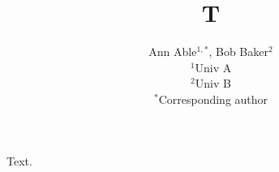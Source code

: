 \documentclass{article}
\begin{document}
\title{T}\author{Ann Able$^{1,*}$, Bob Baker$^{2}$\\ $^1$Univ A\\ $^2$Univ B\\ $^*$Corresponding author}
\maketitle
Text.
\end{document}

